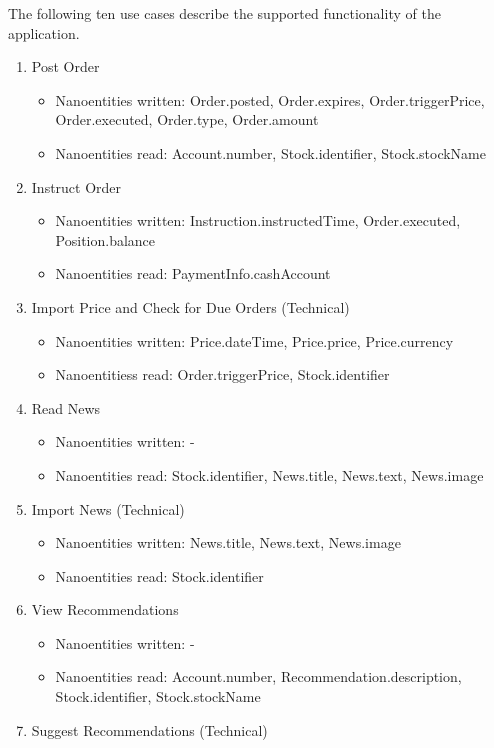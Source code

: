 The following ten use cases describe the supported functionality of the application.

\begin{enumerate}
\item Post Order
	\begin{itemize}
	\item Nanoentities written: Order.posted,  Order.expires, Order.triggerPrice, Order.executed, Order.type, Order.amount
	\item Nanoentities read: Account.number, Stock.identifier, Stock.stockName
	\end{itemize}
\item Instruct Order
	\begin{itemize}
	\item Nanoentities written: Instruction.instructedTime, Order.executed, Position.balance
	\item Nanoentities read: PaymentInfo.cashAccount
	\end{itemize}
\item Import Price and Check for Due Orders (Technical)
	\begin{itemize}
	\item Nanoentities written: Price.dateTime, Price.price, Price.currency
	\item Nanoentitiess read: Order.triggerPrice, Stock.identifier
	\end{itemize}
\item Read News
	\begin{itemize}
	\item Nanoentities written: - 
	\item Nanoentities read: Stock.identifier, News.title, News.text, News.image
	\end{itemize}
\item Import News (Technical)
	\begin{itemize}
	\item Nanoentities written: News.title, News.text, News.image
	\item Nanoentities read: Stock.identifier
	\end{itemize}
\item View Recommendations
	\begin{itemize}
	\item Nanoentities written: -
	\item Nanoentities read: Account.number, Recommendation.description, Stock.identifier, Stock.stockName
	\end{itemize}
\item Suggest Recommendations (Technical)

\end{enumerate}

